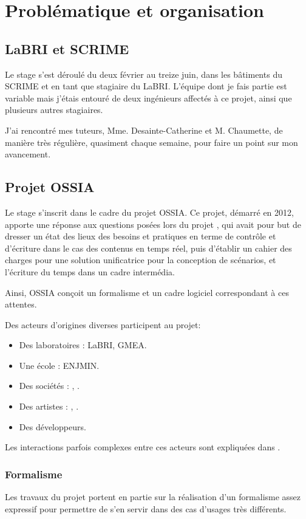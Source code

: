 \chapter{Problématique et organisation}
\section{LaBRI et SCRIME}
Le stage s'est déroulé du deux février au treize juin, dans les bâtiments du \ac{SCRIME} et en tant que stagiaire du \ac{LaBRI}. L'équipe dont je fais partie est variable mais j'étais entouré de deux ingénieurs affectés à ce projet, ainsi que plusieurs autres stagiaires.

J'ai rencontré mes tuteurs, Mme. Desainte-Catherine et M. Chaumette, de manière très régulière, quasiment chaque semaine, pour faire un point sur mon avancement.

\section{Projet OSSIA}
Le stage s'inscrit dans le cadre du projet  \ac{OSSIA}. Ce projet, démarré en 2012, apporte une réponse aux questions posées lors du projet , qui avait pour but de dresser un état des lieux des besoins et pratiques en terme de contrôle et d'écriture dans le cas des contenus en temps réel, puis d'établir un cahier des charges pour une solution unificatrice pour la conception de scénarios, et l'écriture du temps dans un cadre intermédia.

Ainsi, \ac{OSSIA} conçoit un formalisme et un cadre logiciel correspondant à ces attentes.

Des acteurs d'origines diverses participent au projet:
\begin{itemize}
	\item Des laboratoires : \ac{LaBRI}, \ac{GMEA}.
	\item Une école : \ac{ENJMIN}.
	\item Des sociétés : , .
	\item Des artistes : , .
	\item Des développeurs.
\end{itemize}

Les interactions parfois complexes entre ces acteurs sont expliquées dans \cite{meyssonnier2013analyse}.

\subsection{Formalisme}
Les travaux du projet portent en partie sur la réalisation d'un formalisme assez expressif pour permettre de s'en servir dans des cas d'usages très différents.

